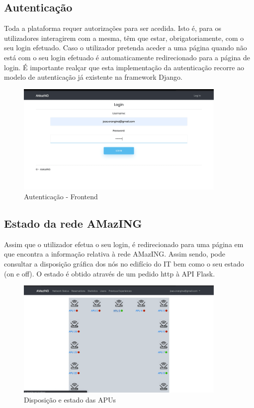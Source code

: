 \subsection{Autenticação}
Toda a plataforma requer autorizações para ser acedida. Isto é, para os utilizadores interagirem com a mesma, têm que estar, obrigatoriamente, com o seu login efetuado. Caso o utilizador pretenda aceder a uma página quando não está com o seu login efetuado é automaticamente redirecionado para a página de login.\newline
É importante realçar que esta implementação da autenticação recorre ao modelo de autenticação já existente na framework Django.\hfill\break
\begin{figure}[!ht]
    \centering
    \includegraphics[width=0.9\textwidth]{images/login.png}
    \caption{Autenticação - Frontend}
    \label{fig:login}
\end{figure}
\newpage
\subsection{Estado da rede AMazING}
Assim que o utilizador efetua o seu login, é redirecionado para uma página em que encontra a informação relativa à rede AMazING. Assim sendo, pode consultar a disposição gráfica dos nós no edifício do IT bem como o seu estado (on e off). O estado é obtido através de um pedido http à API Flask.
\begin{figure}[!ht]
    \centering
    \includegraphics[width=0.9\textwidth]{images/main_page.png}
    \caption{Disposição e estado das APUs}
    \label{fig:mainpage}
\end{figure}

